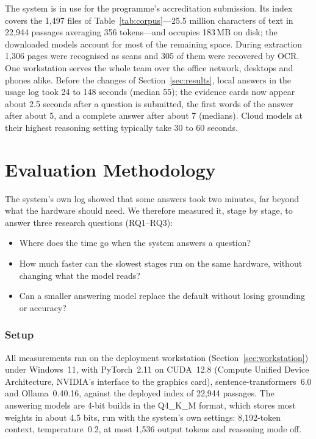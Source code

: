 \documentclass[conference]{IEEEtran}
\begin{document}
The system is in use for the programme's accreditation submission. Its index
covers the 1{,}497 files of Table~\ref{tab:corpus}---25.5 million characters
of text in 22{,}944 passages averaging 356 tokens---and occupies 183\,MB on
disk; the downloaded models account for most of the remaining space. During
extraction 1{,}306 pages were recognised as scans and 305 of them were
recovered by OCR. One workstation serves the whole team over the office
network, desktops and phones alike. Before the changes of
Section~\ref{sec:results}, local answers in the usage log took 24 to 148
seconds (median 55); the evidence cards now appear about 2.5 seconds after a
question is submitted, the first words of the answer after about 5, and a
complete answer after about 7 (medians). Cloud models at their
highest reasoning setting typically take 30 to 60 seconds.

\section{Evaluation Methodology}
\label{sec:method}

The system's own log showed that some answers took two minutes, far beyond
what the hardware should need. We therefore measured it, stage by stage, to
answer three research questions (RQ1--RQ3):
\begin{itemize}
\item[RQ1] Where does the time go when the system answers a question?
\item[RQ2] How much faster can the slowest stages run on the same hardware,
  without changing what the model reads?
\item[RQ3] Can a smaller answering model replace the default without losing
  grounding or accuracy?
\end{itemize}

\subsubsection{Setup}
All measurements ran on the deployment workstation
(Section~\ref{sec:workstation}) under Windows~11, with PyTorch~2.11 on CUDA~12.8
(Compute Unified Device Architecture, NVIDIA's interface to the graphics card),
sentence-transformers~6.0 and Ollama~0.40.16, against the deployed index of
22{,}944 passages. The answering models are 4-bit builds in the Q4\_K\_M
format, which stores most weights in about 4.5 bits, run with
the system's own settings: 8{,}192-token context, temperature~0.2, at most
1{,}536 output tokens and reasoning mode off.
\end{document}
